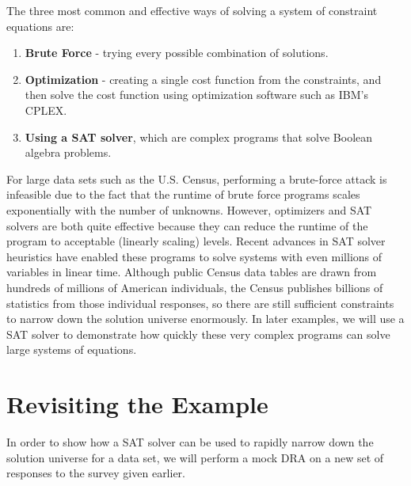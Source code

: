 \documentclass[jou,apacite]{apa6}
\begin{document}
The three most common and effective ways of solving a
system of constraint equations are:
\begin{enumerate}

\item \textbf{Brute Force} - trying every possible combination of solutions.\\
\item \textbf{Optimization} - creating a single cost function from the constraints, and then solve the cost function using optimization software such as IBM's CPLEX. \\
\item \textbf{Using a SAT solver}, which are complex programs that solve Boolean algebra problems.

\end{enumerate}

For large data sets such as the U.S. Census, performing a brute-force attack is infeasible due to the fact that the runtime of brute force programs scales exponentially with the number of unknowns. However, optimizers and SAT solvers are both quite effective because they can reduce the runtime of the program to acceptable (linearly scaling) levels. Recent advances in SAT solver heuristics have enabled these programs to solve systems with even millions of variables in linear time. Although public Census data tables are drawn from hundreds of millions of American individuals, the Census publishes billions of statistics from those individual responses, so there are still sufficient constraints to narrow down the solution universe enormously. In later examples, we will use a SAT solver to demonstrate how quickly these very complex programs can solve large systems of equations.

\section{Revisiting the Example}

In order to show how a SAT solver can be used to rapidly narrow down the solution universe for a data set, we will perform a mock DRA on a new set of responses to the survey given earlier.
\end{document}
